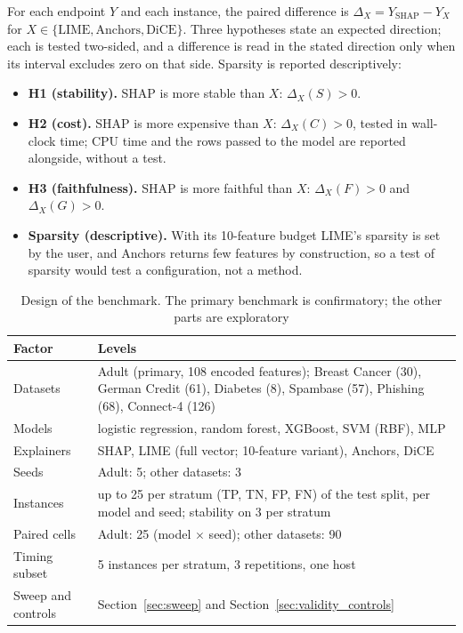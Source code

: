 \documentclass[11pt,a4paper]{article}
\begin{document}
For each endpoint $Y$ and each instance, the paired difference is
$\Delta_X = Y_{\mathrm{SHAP}} - Y_X$ for $X \in \{\mathrm{LIME},
\mathrm{Anchors}, \mathrm{DiCE}\}$. Three hypotheses state an expected
direction; each is tested two-sided, and a difference is read in the stated
direction only when its interval excludes zero on that side. Sparsity is
reported descriptively:
\begin{itemize}
\item \textbf{H1 (stability).} SHAP is more stable than $X$:
$\Delta_X(S) > 0$.
\item \textbf{H2 (cost).} SHAP is more expensive than $X$:
$\Delta_X(C) > 0$, tested in wall-clock time; CPU time and the rows passed
to the model are reported alongside, without a test.
\item \textbf{H3 (faithfulness).} SHAP is more faithful than $X$:
$\Delta_X(F) > 0$ and $\Delta_X(G) > 0$.
\item \textbf{Sparsity (descriptive).} With its 10-feature budget LIME's
sparsity is set by the user, and Anchors returns few features by
construction, so a test of sparsity would test a configuration, not a
method.
\end{itemize}

\begin{table}[htb]
\centering
\caption{Design of the benchmark. The primary benchmark is confirmatory; the
other parts are exploratory}
\label{tab:design}
\begin{tabularx}{\linewidth}{p{3.1cm} X}
\toprule
\textbf{Factor} & \textbf{Levels} \\
\midrule
Datasets & Adult (primary, 108 encoded features); Breast Cancer (30), German
Credit (61), Diabetes (8), Spambase (57), Phishing (68), Connect-4 (126) \\
Models & logistic regression, random forest, XGBoost, SVM (RBF), MLP \\
Explainers & SHAP, LIME (full vector; 10-feature variant), Anchors, DiCE \\
Seeds & Adult: 5; other datasets: 3 \\
Instances & up to 25 per stratum (TP, TN, FP, FN) of the test split, per
model and seed; stability on 3 per stratum \\
Paired cells & Adult: 25 (model $\times$ seed); other datasets: 90 \\
Timing subset & 5 instances per stratum, 3 repetitions, one host \\
Sweep and controls & Section~\ref{sec:sweep} and
Section~\ref{sec:validity_controls} \\
\bottomrule
\end{tabularx}
\end{table}
\end{document}
